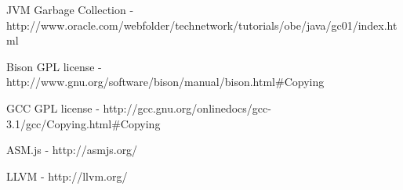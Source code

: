 \documentclass[]{final_report}
\begin{document}
\newpage
\begin{thebibliography}{99}
JVM Garbage Collection - http://www.oracle.com/webfolder/technetwork/tutorials/obe/java/gc01/index.html
Bison GPL license - http://www.gnu.org/software/bison/manual/bison.html\#Copying
GCC GPL license - http://gcc.gnu.org/onlinedocs/gcc-3.1/gcc/Copying.html\#Copying
ASM.js - http://asmjs.org/
LLVM - http://llvm.org/
\end{thebibliography}
\label{endpage}
\end{document}
